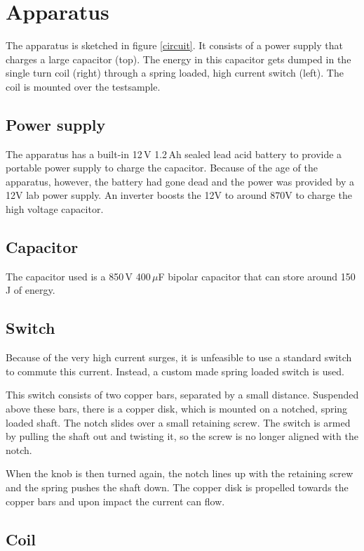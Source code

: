 \section{Apparatus}
The apparatus is sketched in figure \ref{circuit}. It consists of a power 
supply that charges a large capacitor (top).  The energy in this capacitor 
gets dumped in the single turn coil (right) through a spring loaded, high 
current switch (left). The coil is mounted over the testsample.


\subsection{Power supply}
The apparatus has a built-in 12\,V 1.2\,Ah sealed lead acid battery to provide 
a portable power supply to charge the capacitor. Because of the age of the 
apparatus, however, the battery had gone dead and the power was provided by a 
12V lab power supply. An inverter boosts the 12V to around 870V to charge the 
high voltage capacitor.

\subsection{Capacitor}
The capacitor used is a 850\,V 400\,$\mu$F bipolar capacitor that can store 
around 150\,J of energy.

\subsection{Switch}
Because of the very high current surges, it is unfeasible to use a standard 
switch to commute this current. Instead, a custom made spring loaded switch is 
used.

This switch consists of two copper bars, separated by a small distance.  
Suspended above these bars, there is a copper disk, which is mounted on a 
notched, spring loaded shaft. The notch slides over a small retaining screw.  
The switch is armed by pulling the shaft out and twisting it, so the screw is 
no longer aligned with the notch.

When the knob is then turned again, the notch lines up with the retaining 
screw and the spring pushes the shaft down. The copper disk is propelled 
towards the copper bars and upon impact the current can flow.

\subsection{Coil}

